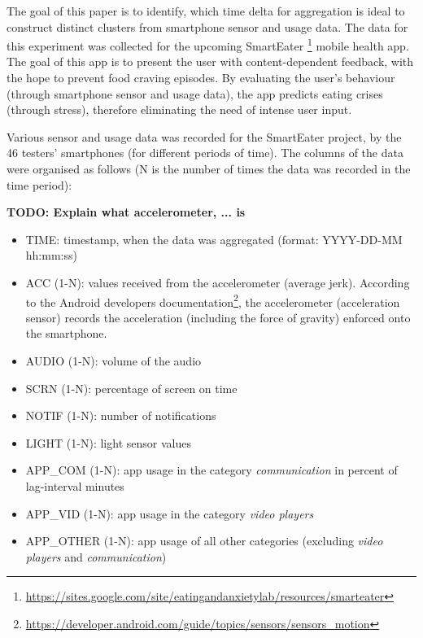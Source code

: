 

The goal of this paper is to identify, which time delta for aggregation is ideal to construct distinct clusters from smartphone sensor and usage data. The data for this experiment was collected for the upcoming SmartEater \footnote{\url{https://sites.google.com/site/eatingandanxietylab/resources/smarteater}} mobile health app. The goal of this app is to present the user with content-dependent feedback, with the hope to prevent food craving episodes. By evaluating the user's behaviour (through smartphone sensor and usage data), the app predicts eating crises (through stress), therefore eliminating the need of intense user input. 



Various sensor and usage data was recorded for the SmartEater project, by the 46 testers' smartphones (for different periods of time). The columns of the data were organised as follows (N is the number of times the data was recorded in the time period):
 
\textbf{TODO: Explain what accelerometer, ... is}

\begin{itemize}
	\item TIME: timestamp, when the data was aggregated (format: YYYY-DD-MM hh:mm:ss)
	\item ACC (1-N): values received from the accelerometer (average jerk). According to the Android developers documentation\footnote{\url{https://developer.android.com/guide/topics/sensors/sensors_motion}}, the accelerometer (acceleration sensor) records the acceleration (including the force of gravity) enforced onto the smartphone.  
	\item AUDIO (1-N): volume of the audio 
	\item SCRN (1-N): percentage of screen on time
	\item NOTIF (1-N): number of notifications
	\item LIGHT (1-N): light sensor values
	\item APP\_COM (1-N): app usage in the category \textit{communication} in percent of lag-interval minutes 
	\item APP\_VID (1-N): app usage in the category \textit{video players}
	\item APP\_OTHER (1-N): app usage of all other categories (excluding \textit{video players} and \textit{communication})
\end{itemize}



